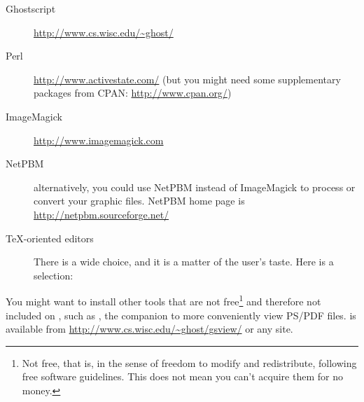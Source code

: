 \documentclass{article}
\begin{document}
\begin{description}
\item[Ghostscript] \url{http://www.cs.wisc.edu/~ghost/}
\item[Perl] \url{http://www.activestate.com/} (but you might need some
      supplementary packages from CPAN: \url{http://www.cpan.org/})
\item[ImageMagick] \url{http://www.imagemagick.com}
\item[NetPBM] alternatively, you could use NetPBM instead of ImageMagick to
      process or convert your graphic files. NetPBM home page is
      \url{http://netpbm.sourceforge.net/}
\item[\TeX-oriented editors] There is a wide choice, and it is a matter of the
      user's taste. Here is a selection:
\end{description}

You might want to install other tools that are not free\footnote{Not
free, that is, in the sense of freedom to modify and redistribute,
following free software guidelines.  This does not mean you can't acquire
them for no money.} and therefore not included on \TL{}, such as
, the  companion to more
conveniently view PS/PDF files.  is available from
\url{http://www.cs.wisc.edu/~ghost/gsview/} or any  site.
\end{document}
